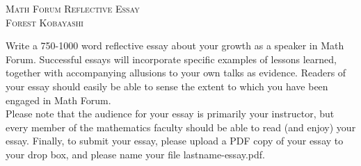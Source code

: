 \documentclass{fkpset}
\begin{document}
\vspace{-1.9cm}
\begin{center}
  {\LARGE \scshape Math Forum Reflective Essay} \\[.5em]
  {\Large \scshape Forest Kobayashi}
\end{center}
\vspace{.8cm}

\begin{problem}[Prompt]
  Write a 750-1000 word reflective essay about your growth as a
  speaker in Math Forum. Successful essays will incorporate specific
  examples of lessons learned, together with accompanying allusions to
  your own talks as evidence. Readers of your essay should easily be
  able to sense the extent to which you have been engaged in Math
  Forum.\\

  Please note that the audience for your essay is primarily your
  instructor, but every member of the mathematics faculty should be
  able to read (and enjoy) your essay. Finally, to submit your essay,
  please upload a PDF copy of your essay to your drop box, and please
  name your file lastname-essay.pdf.
\end{problem}
\end{document}
